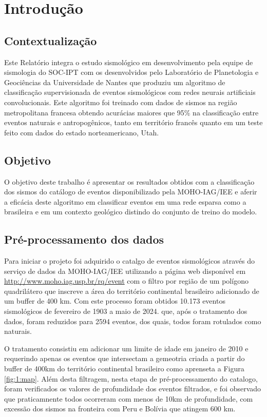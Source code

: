 \section{Introdução}

\subsection{Contextualização}
\par{
    Este Relatório integra o estudo sismológico em desenvolvimento pela equipe de sismologia do SOC-IPT com os desenvolvidos pelo Laboratório de Planetologia e Geociências da Universidade de Nantes que produziu um algoritmo de classificação supervisionada de eventos sismológicos com redes neurais artificiais convolucionais. Este algoritmo foi treinado com dados de sismos na região metropolitana francesa obtendo acurácias maiores que 95\% na classificação entre eventos naturais e antropogênicos, tanto em território francês quanto em um teste feito com dados do estado norteamericano, Utah.
}

\subsection{Objetivo}
\par{
    O objetivo deste trabalho é apresentar os resultados obtidos com a classificação dos sismos do catálogo de eventos disponibilizado pela MOHO-IAG/IEE e aferir a eficácia deste algoritmo em classificar eventos em uma rede esparsa como a brasileira e em um contexto geológico distindo do conjunto de treino do modelo.
}

\subsection{Pré-processamento dos dados}

\par{
    Para iniciar o projeto foi adquirido o catalgo de eventos sismológicos através do serviço de dados da MOHO-IAG/IEE utilizando a página web disponível em \url{http://www.moho.iag.usp.br/rq/event} com o filtro por região de um polígono quadrilátero que inscreve a área do território continental brasileiro adicionado de um buffer de 400 km. Com este processo foram obtidos 10.173 eventos sismológicos de fevereiro de 1903 a maio de 2024. que, após o tratamento dos dados, foram reduzidos para 2594 eventos, dos quais, todos foram rotulados como naturais.
}

\par{
    O tratamento consistiu em adicionar um limite de idade em janeiro de 2010 e requerindo apenas os eventos que intersectam a gemeotria criada a partir do buffer de 400km do território continental brasileiro como aprenseta a Figura \ref{fig:1:map}. Além desta filtragem, nesta etapa de pré-processamento do catalogo, foram verificados os valores de profundidade dos eventos filtrados, e foi observado que praticamnente todos ocorreram com menos de 10km de profundidade, com excessão dos sismos na fronteira com Peru e Bolívia que atingem 600 km.
}

